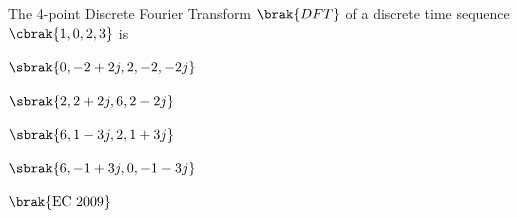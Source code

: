 \item The 4-point Discrete Fourier Transform $\brak{DFT}$ of a discrete time sequence $\cbrak{1,0,2,3}$ is 
\begin{enumerate}
    \begin{multicols}{2}
        \item $\sbrak{0,-2+2j, 2,-2,-2j}$
        \item $\sbrak{2,2+2j, 6, 2-2j}$
        \item $\sbrak{6,1-3j, 2, 1+3j}$
        \item $\sbrak{6,-1+3j, 0,-1-3j}$
    
    \end{multicols}
\end{enumerate}
\hfill $\brak{\text{EC 2009}}$

